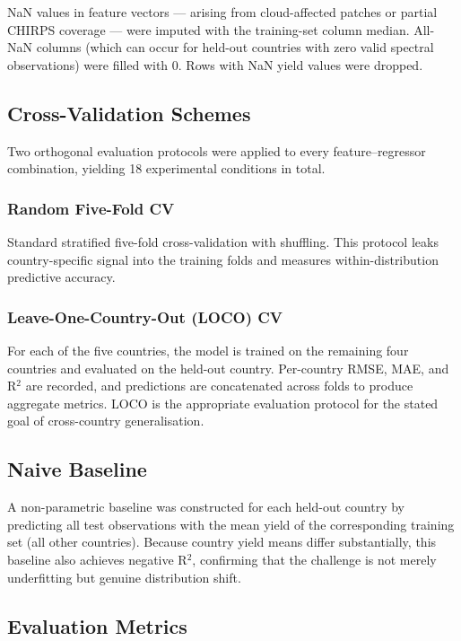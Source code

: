 \documentclass[journal]{IEEEtran}
\begin{document}
NaN values in feature vectors — arising from cloud-affected patches or
partial CHIRPS coverage — were imputed with the training-set column median.
All-NaN columns (which can occur for held-out countries with zero valid
spectral observations) were filled with 0. Rows with NaN yield values were dropped.

\subsection{Cross-Validation Schemes}

Two orthogonal evaluation protocols were applied to every feature--regressor
combination, yielding 18 experimental conditions in total.

\subsubsection{Random Five-Fold CV}
Standard stratified five-fold cross-validation with shuffling.
This protocol leaks country-specific signal into the training folds
and measures within-distribution predictive accuracy.

\subsubsection{Leave-One-Country-Out (LOCO) CV}
For each of the five countries, the model is trained on the remaining
four countries and evaluated on the held-out country.
Per-country RMSE, MAE, and R$^2$ are recorded, and predictions are
concatenated across folds to produce aggregate metrics.
LOCO is the appropriate evaluation protocol for the stated goal of
cross-country generalisation.

\subsection{Naive Baseline}

A non-parametric baseline was constructed for each held-out country
by predicting all test observations with the mean yield of the
corresponding training set (all other countries).
Because country yield means differ substantially, this baseline also
achieves negative R$^2$, confirming that the challenge is not merely
underfitting but genuine distribution shift.

\subsection{Evaluation Metrics}
\end{document}
